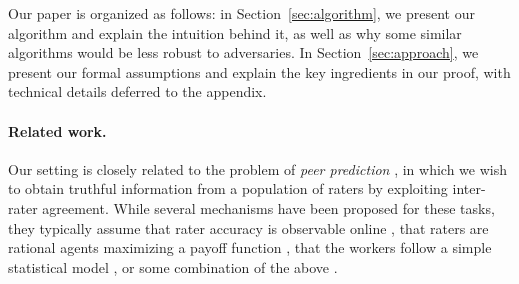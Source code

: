 
Our paper is organized as follows: in Section~\ref{sec:algorithm}, we 
present our algorithm and explain the intuition behind it, as well as why 
some similar algorithms would be less robust to adversaries. In 
Section~\ref{sec:approach}, we present our formal assumptions and explain 
the key ingredients in our proof, with technical details deferred to the 
appendix. %

\paragraph{Related work.}
Our setting is closely related to the problem of \emph{peer prediction} 
\citep{miller2005eliciting}, in which we wish to obtain truthful information 
from a population of raters by exploiting inter-rater agreement. 
While several mechanisms have been proposed for these tasks, 
they typically assume that rater accuracy is observable online
\citep{resnick2007influence}, that raters are 
rational agents maximizing a payoff function \citep{dasgupta2013crowdsourced,
kamble2015truth,shnayder2016strong}, that the workers follow a simple 
statistical model \citep{karger2014budget,zhang2014crowdsourcing,
zhou2015regularized}, or some combination of the above \citep{shah2015double,
shah2015approval}. 

